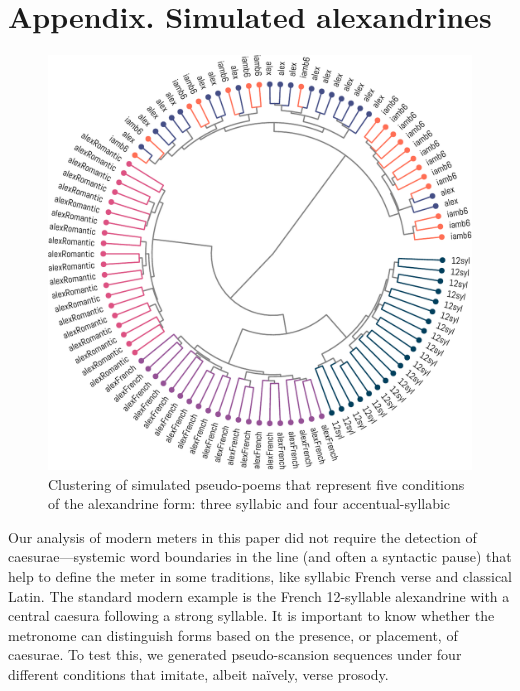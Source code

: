\documentclass[
    hf
]{ceurart}
\begin{document}
\printbibliography
\FloatBarrier

\appendix
\section*{Appendix. Simulated alexandrines}\label{sec:appendix}

\begin{figure}
    \includegraphics[width=\linewidth]{figures/sim_alexandrines-crop.pdf}
    \caption{Clustering of simulated pseudo-poems that represent five conditions of the alexandrine form: three syllabic and four accentual-syllabic}
    \label{fig:sim_alex}
\end{figure}

Our analysis of modern meters in this paper did not require the detection of caesurae---systemic word boundaries in the line (and often a syntactic pause) that help to define the meter in some traditions, like syllabic French verse and classical Latin. The standard modern example is the French 12-syllable alexandrine with a central caesura following a strong syllable. It is important to know whether the metronome can distinguish forms based on the presence, or placement, of caesurae. To test this, we generated pseudo-scansion sequences under four different conditions that imitate, albeit naïvely, verse prosody.
\end{document}

